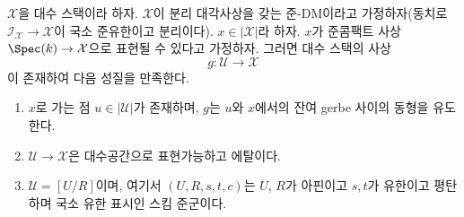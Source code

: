 \begin{lemma}
\label{lemma-etale-local-quasi-DM-at-x-inertia}
$\mathcal{X}$을 대수 스택이라 하자. $\mathcal{X}$이 분리 대각사상을 갖는
준-DM이라고 가정하자(동치로
$\mathcal{I}_\mathcal{X} \to \mathcal{X}$이 국소 준유한이고 분리이다).
$x \in |\mathcal{X}|$라 하자. $x$가 준콤팩트 사상
$\Spec(k) \to \mathcal{X}$으로 표현될 수 있다고 가정하자. 그러면 대수
스택의 사상
$$
g : \mathcal{U} \longrightarrow \mathcal{X}
$$
이 존재하여 다음 성질을 만족한다.
\begin{enumerate}
\item $x$로 가는 점 $u \in |\mathcal{U}|$가 존재하며, $g$는 $u$와
$x$에서의 잔여 gerbe 사이의 동형을 유도한다.
\item $\mathcal{U} \to \mathcal{X}$은 대수공간으로 표현가능하고 에탈이다.
\item $\mathcal{U} = [U/R]$이며, 여기서 $(U, R, s, t, c)$는 $U$, $R$가
아핀이고 $s, t$가 유한이고 평탄하며 국소 유한 표시인 스킴 준군이다.
\end{enumerate}
\end{lemma}

